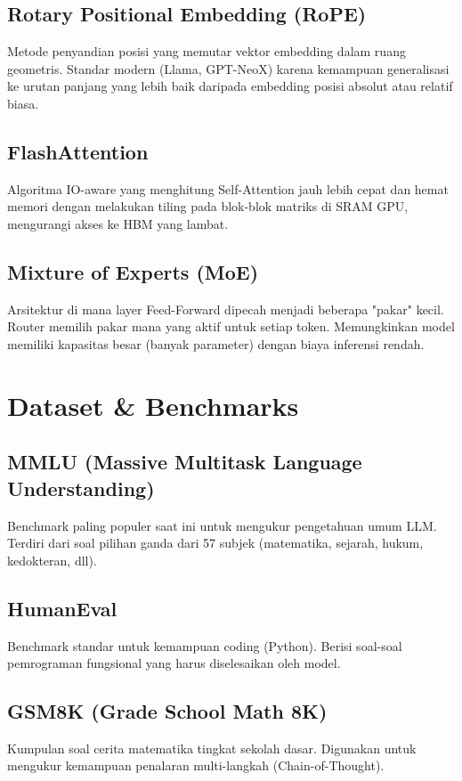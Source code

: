 \subsection{Rotary Positional Embedding (RoPE)}
Metode penyandian posisi yang memutar vektor embedding dalam ruang geometris. Standar modern (Llama, GPT-NeoX) karena kemampuan generalisasi ke urutan panjang yang lebih baik daripada embedding posisi absolut atau relatif biasa.

\subsection{FlashAttention}
Algoritma IO-aware yang menghitung Self-Attention jauh lebih cepat dan hemat memori dengan melakukan tiling pada blok-blok matriks di SRAM GPU, mengurangi akses ke HBM yang lambat.

\subsection{Mixture of Experts (MoE)}
Arsitektur di mana layer Feed-Forward dipecah menjadi beberapa "pakar" kecil. Router memilih pakar mana yang aktif untuk setiap token. Memungkinkan model memiliki kapasitas besar (banyak parameter) dengan biaya inferensi rendah.

\section{Dataset \& Benchmarks}

\subsection{MMLU (Massive Multitask Language Understanding)}
Benchmark paling populer saat ini untuk mengukur pengetahuan umum LLM. Terdiri dari soal pilihan ganda dari 57 subjek (matematika, sejarah, hukum, kedokteran, dll).

\subsection{HumanEval}
Benchmark standar untuk kemampuan coding (Python). Berisi soal-soal pemrograman fungsional yang harus diselesaikan oleh model.

\subsection{GSM8K (Grade School Math 8K)}
Kumpulan soal cerita matematika tingkat sekolah dasar. Digunakan untuk mengukur kemampuan penalaran multi-langkah (Chain-of-Thought).

